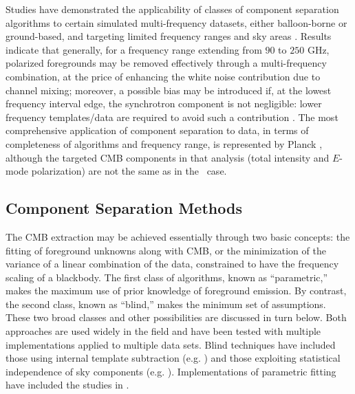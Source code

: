 Studies have demonstrated the applicability of classes of component separation 
algorithms to certain simulated multi-frequency datasets, either balloon-borne or ground-based, and targeting limited frequency ranges and sky areas \cite{Stivoli:2010rs,Fantaye:2011zq,Fantaye:2012ha}. Results indicate that generally, for a frequency range extending from $90$ to $250$ GHz, polarized foregrounds may be removed effectively through a multi-frequency combination, at the price of enhancing the white noise contribution due to channel mixing; moreover, a possible bias may be introduced if, at the lowest frequency interval edge, the synchrotron component is not negligible: lower frequency templates/data are required to avoid such a contribution \cite{Essinger-Hileman:2014pja}. 
The most comprehensive application of component separation to data, in terms of completeness of algorithms and frequency range, is represented by Planck \cite{Adam:2015tpy}, 
although the targeted CMB components in that analysis (total intensity and $E$-mode polarization) are
not the same as in the \cmbexp\ case.

\subsection{Component Separation Methods}

The CMB extraction may be achieved essentially through two basic concepts: the fitting of foreground unknowns along with CMB, or the minimization of the variance of a linear combination of the data, constrained to have the frequency scaling of a blackbody.
The first class of algorithms, known as ``parametric,'' makes the maximum use of prior knowledge of foreground emission. By contrast, the second class, known as ``blind,'' makes the minimum set of assumptions. 
These two broad classes and other possibilities are discussed in turn below.
Both approaches are used widely in the field and have been tested with multiple implementations applied
to multiple data sets. Blind techniques have included those using internal template subtraction (e.g. \cite{Bennett:1992aa,Hansen:2006rj,Katayama:2011eh}) and those exploiting statistical independence of sky components (e.g. \cite{Delabrouille:2002kz,Maino:2006pq,Bonaldi:2006qw,Stolyarov:2004xp}). Implementations of parametric fitting have included the studies in \cite{Brandt:1994aa,Eriksen:2005dr, Stompor:2008sf}.

